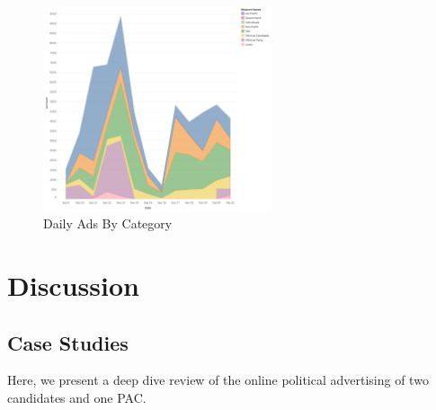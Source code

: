 \documentclass[fleqn,10pt]{wlscirep}
\begin{document}
\begin{figure}
    \centering
    \includegraphics[width=0.6\textwidth]{categories_by_day.png}
    \caption{Daily Ads By Category}
    \label{fig:categories_by_day}
\end{figure}

\section*{Discussion}

\subsection*{Case Studies}

Here, we present a deep dive review of the online political advertising of two candidates and one PAC.
\end{document}
